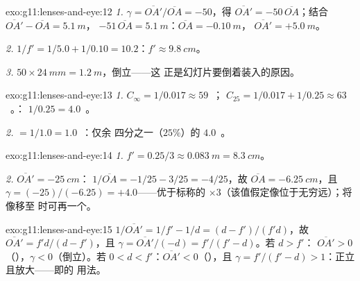 \begin{solution}{exo:g11:lenses-and-eye:12}
\emph{1.} $\gamma = \overline{OA'}/\overline{OA} = -50$，得
$\overline{OA'} = -50\,\overline{OA}$；结合
$\overline{OA'} - \overline{OA} = \qty{5.1}{m}$，
$-51\,\overline{OA} = \qty{5.1}{m}$：$\overline{OA} = \qty{-0.10}{m}$，
$\overline{OA'} = +\qty{5.0}{m}$。

\emph{2.} $1/f' = 1/5.0 + 1/0.10 = 10.2$：$f' \approx \qty{9.8}{cm}$。

\emph{3.} $50 \times \qty{24}{mm} = \qty{1.2}{m}$，倒立——这
正是幻灯片要倒着装入的原因。
\end{solution}

\begin{solution}{exo:g11:lenses-and-eye:13}
\emph{1.} $C_\infty = 1/0.017 \approx 59$~；
$C_{25} = 1/0.017 + 1/0.25 \approx 63$~。：
$1/0.25 = 4.0$~。

\emph{2.}  $= 1/1.0 = 1.0$~：仅余
四分之一（$25\%$）的 $4.0$~。
\end{solution}

\begin{solution}{exo:g11:lenses-and-eye:14}
\emph{1.} $f' = 0.25/3 \approx \qty{0.083}{m} = \qty{8.3}{cm}$。

\emph{2.} $\overline{OA'} = \qty{-25}{cm}$：
$1/\overline{OA} = -1/25 - 3/25 = -4/25$，故
$\overline{OA} = \qty{-6.25}{cm}$，且
$\gamma = (-25)/(-6.25) = +4.0$——优于标称的
$\times 3$（该值假定像位于无穷远）；将像移至
时可再一个。
\end{solution}

\begin{solution}{exo:g11:lenses-and-eye:15}
$1/\overline{OA'} = 1/f' - 1/d = (d - f')/(f'd)$，故
$\overline{OA'} = f'd/(d - f')$，且
$\gamma = \overline{OA'}/(-d) = f'/(f' - d)$。若 $d > f'$：
$\overline{OA'} > 0$（），$\gamma < 0$（倒立）。若
$0 < d < f'$：$\overline{OA'} < 0$（），且
$\gamma = f'/(f' - d) > 1$：正立且放大——即的
用法。
\end{solution}

